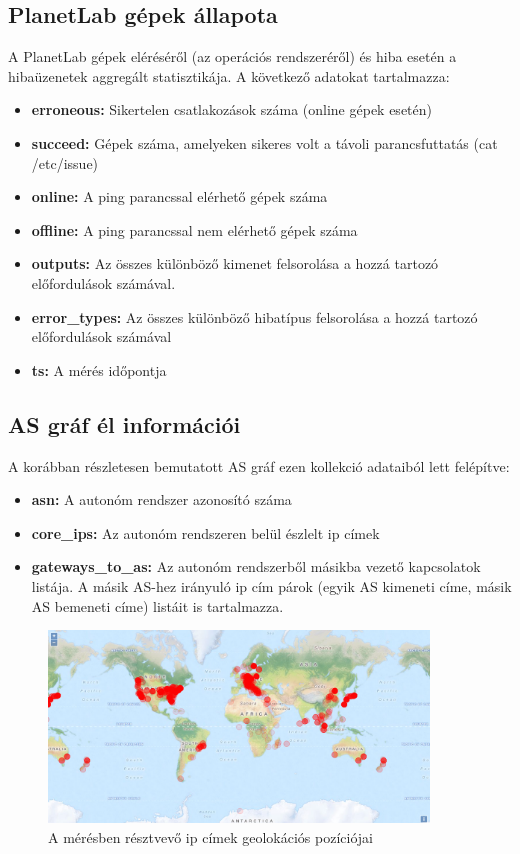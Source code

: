 \subsection*{PlanetLab gépek állapota}
A PlanetLab gépek eléréséről (az operációs rendszeréről) és hiba esetén a hibaüzenetek aggregált statisztikája. A következő adatokat tartalmazza:

\begin{itemize}
\item \textbf{erroneous:} Sikertelen csatlakozások száma (online gépek esetén)
\item \textbf{succeed:} Gépek száma, amelyeken sikeres volt a távoli parancsfuttatás (cat /etc/issue)
\item \textbf{online:} A ping parancssal elérhető gépek száma
\item \textbf{offline:} A ping parancssal nem elérhető gépek száma
\item \textbf{outputs:} Az összes különböző kimenet felsorolása a hozzá tartozó előfordulások számával.
\item \textbf{error\_types:} Az összes különböző hibatípus felsorolása a hozzá tartozó előfordulások számával
\item \textbf{ts:} A mérés időpontja
\end{itemize}

\subsection*{AS gráf él információi}
A korábban részletesen bemutatott AS gráf ezen kollekció adataiból lett felépítve:

\begin{itemize}
\item \textbf{asn:} A autonóm rendszer azonosító száma
\item \textbf{core\_ips:} Az autonóm rendszeren belül észlelt ip címek
\item \textbf{gateways\_to\_as:} Az autonóm rendszerből másikba vezető kapcsolatok listája. A másik AS-hez irányuló ip cím párok (egyik AS kimeneti címe, másik AS bemeneti címe) listáit is tartalmazza.
\end{itemize}



\begin{figure}[h]
	\centering
	\includegraphics[width=0.9\textwidth, keepaspectratio]{figures/ip_map.png}
	\caption{A mérésben résztvevő ip címek geolokációs pozíciójai}
	\label{fig:ip-map}
\end{figure}

